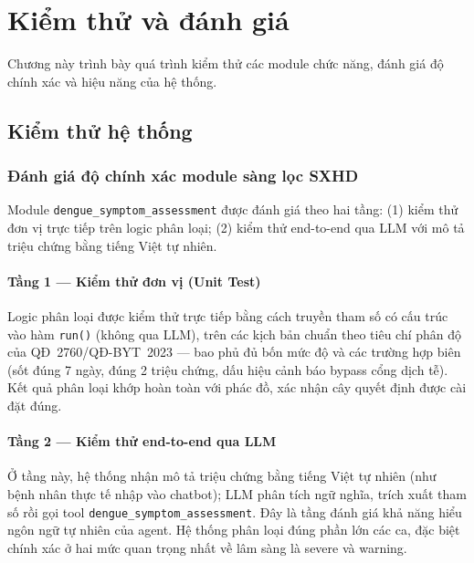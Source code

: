 \documentclass[a4paper,13pt,3p,oneside]{report}
\theoremstyle{definition}
\theoremstyle{remark}
\theoremstyle{definition}
\begin{document}
\chapter{Kiểm thử và đánh giá}

Chương này trình bày quá trình kiểm thử các module chức năng, đánh giá độ chính xác và hiệu năng của hệ thống.

\section{Kiểm thử hệ thống}

\subsection{Đánh giá độ chính xác module sàng lọc SXHD}

Module \texttt{dengue\_symptom\_assessment} được đánh giá theo hai tầng: (1) kiểm thử đơn vị trực tiếp trên logic phân loại; (2) kiểm thử end-to-end qua LLM với mô tả triệu chứng bằng tiếng Việt tự nhiên.

\subsubsection{Tầng 1 — Kiểm thử đơn vị (Unit Test)}

Logic phân loại được kiểm thử trực tiếp bằng cách truyền tham số có cấu trúc vào hàm \texttt{run()} (không qua LLM), trên các kịch bản chuẩn theo tiêu chí phân độ của QĐ~2760/QĐ-BYT~2023 --- bao phủ đủ bốn mức độ và các trường hợp biên (sốt đúng 7 ngày, đúng 2 triệu chứng, dấu hiệu cảnh báo bypass cổng dịch tễ). Kết quả phân loại khớp hoàn toàn với phác đồ, xác nhận cây quyết định được cài đặt đúng.

\subsubsection{Tầng 2 — Kiểm thử end-to-end qua LLM}

Ở tầng này, hệ thống nhận mô tả triệu chứng bằng tiếng Việt tự nhiên (như bệnh nhân thực tế nhập vào chatbot); LLM phân tích ngữ nghĩa, trích xuất tham số rồi gọi tool \texttt{dengue\_symptom\_assessment}. Đây là tầng đánh giá khả năng hiểu ngôn ngữ tự nhiên của agent. Hệ thống phân loại đúng phần lớn các ca, đặc biệt chính xác ở hai mức quan trọng nhất về lâm sàng là severe và warning.
\end{document}
